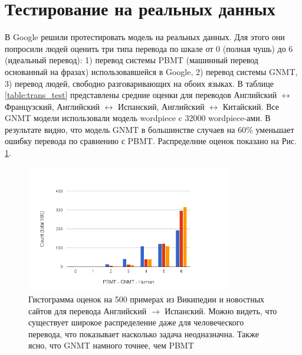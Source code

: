 \documentclass[12pt, a4paper]{article}
\begin{document}
    \section{Тестирование на реальных данных}
        В Google решили протестировать модель на реальных данных. Для этого они попросили людей оценить три типа перевода по шкале от 0 (полная чушь) до 6 (идеальный перевод): 1) перевод системы PBMT (машинный перевод основанный на фразах) использовавшейся в Google, 2) перевод системы GNMT, 3) перевод людей, свободно разговаривающих на обоих языках. В таблице \ref{table:trans_test} представлены средние оценки для переводов Английский $\leftrightarrow$ Французский, Английский $\leftrightarrow$ Испанский, Английский $\leftrightarrow$ Китайский. Все GNMT модели использовали модель wordpiece c 32000 wordpiece-ами. В результате видно, что модель GNMT в большинстве случаев на 60\% уменьшает ошибку перевода по сравнению с PBMT. Распределние оценок показано на Рис. \ref{fig:hist}.

        \begin{figure}
            \centering
            \includegraphics[width=0.8\textwidth]{hist.png}
            \caption{Гистограмма оценок на 500 примерах из Википедии и новостных сайтов для перевода Английский $\rightarrow$ Испанский. Можно видеть, что существует широкое распределение даже для человеческого перевода, что показывает насколько задача неодназначна. Также ясно, что GNMT намного точнее, чем PBMT}
            \label{fig:hist}
        \end{figure}
\end{document}
